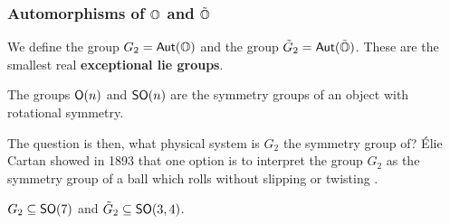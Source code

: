 \subsubsection{Automorphisms of $\operatorname{\mathbb{O}}$ and $\tilde{\operatorname{\mathbb{O}}}$}
\begin{defn}
We define the group $G_2 = \operatorname{\textsf{Aut}}(\operatorname{\mathbb{O}})$ and the group $\tilde{G}_2=\operatorname{\textsf{Aut}}(\tilde{\operatorname{\mathbb{O}}})$. These are the smallest real \textbf{exceptional lie groups}.
\end{defn}
\begin{physics*}
    The groups $\operatorname{\textsf{O}}(n)$ and $\operatorname{\textsf{SO}}(n)$ are the symmetry groups of an object with rotational symmetry.

    The question is then, what physical system is $G_2$ the symmetry group of? \'Elie Cartan showed in 1893 that one option is to interpret the group $G_2$ as the symmetry group of a ball which rolls without slipping or twisting \cite{cartan1893}.
\end{physics*}
\begin{thm}
    $G_2 \subseteq \operatorname{\textsf{SO}}(7)$ and $\tilde{G}_2 \subseteq \operatorname{\textsf{SO}}(3,4)$.
\end{thm}
